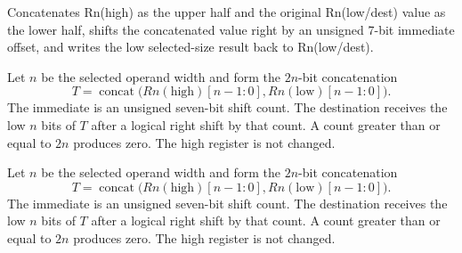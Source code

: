 Concatenates Rn(high) as the upper half and the original Rn(low/dest) value as the lower half, shifts the concatenated value right by an unsigned 7-bit immediate offset, and writes the low selected-size result back to Rn(low/dest).

Let \(n\) be the selected operand width and form the \(2n\)-bit concatenation
\[
  T = \operatorname{concat}\bigl(Rn(\mathrm{high})[n-1:0],
                                Rn(\mathrm{low})[n-1:0]\bigr).
\]
The immediate is an unsigned seven-bit shift count. The destination receives the low \(n\) bits of \(T\) after a logical right shift by that count. A count greater than or equal to \(2n\) produces zero. The high register is not changed.

Let \(n\) be the selected operand width and form the \(2n\)-bit concatenation
\[
  T = \operatorname{concat}\bigl(Rn(\mathrm{high})[n-1:0],
                                Rn(\mathrm{low})[n-1:0]\bigr).
\]
The immediate is an unsigned seven-bit shift count. The destination receives the low \(n\) bits of \(T\) after a logical right shift by that count. A count greater than or equal to \(2n\) produces zero. The high register is not changed.
